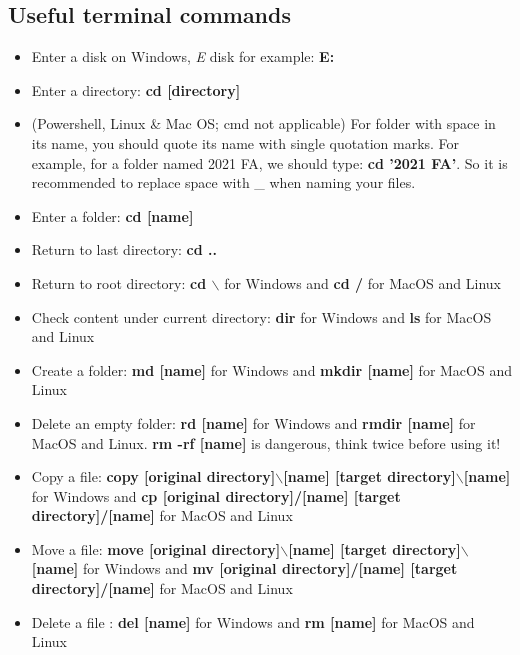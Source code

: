 \documentclass[11pt]{exam}
\begin{document}
\subsection{Useful terminal commands}
\begin{itemize}
    \item Enter a disk on Windows, \textit{E} disk for example: \textbf{E:}
    \item Enter a directory: \textbf{cd [directory]} 
    \item (Powershell, Linux \& Mac OS; cmd not applicable) For folder with space in its name, you should quote its name with single quotation marks. For example, for a folder named 2021 FA, we should type: \textbf{cd '2021 FA'}. So it is recommended to replace space with \_ when naming your files.
    \item Enter a folder: \textbf{cd [name]}
    \item Return to last directory: \textbf{cd ..}
    \item Return to root directory: \textbf{cd $\backslash$ } for Windows and \textbf{cd /} for MacOS and Linux
    \item Check content under current directory: \textbf{dir} for Windows and \textbf{ls} for MacOS and Linux
    \item Create a folder: \textbf{md [name]} for Windows and \textbf{mkdir [name]} for MacOS and Linux
    \item Delete an empty folder: \textbf{rd [name]} for Windows and \textbf{rmdir [name]} for MacOS and Linux. \textbf{rm -rf [name]} is dangerous, think twice before using it!
    \item Copy a file:  \textbf{copy [original directory]$\backslash$[name] [target directory]$\backslash$[name]} for Windows and \textbf{cp  [original directory]/[name] [target directory]/[name]} for MacOS and Linux
    \item Move a file: \textbf{move [original directory]$\backslash$[name] [target directory]$\backslash$[name]} for Windows and \textbf{mv  [original directory]/[name] [target directory]/[name]} for MacOS and Linux
    \item Delete a file : \textbf{del [name]} for Windows and \textbf{rm [name]} for MacOS and Linux
\end{itemize}
\end{document}
